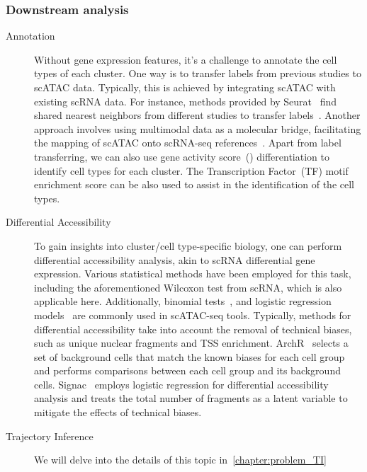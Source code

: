 \subsubsection{Downstream analysis}
\label{background:sec2:atac_downstream}
\begin{description}

	\item[Annotation]
	Without gene expression features, it's a challenge to annotate the cell types of each cluster. One way is to transfer labels from previous studies to scATAC data. Typically, this is achieved by integrating scATAC with existing scRNA data. For instance, methods provided by Seurat~\citep{stuart2019seurat3} find shared nearest neighbors from different studies to transfer labels~\citep{stuart2019seurat3}. Another approach involves using multimodal data as a molecular bridge, facilitating the mapping of scATAC onto scRNA-seq references~\citep{hao2023dictionary}. Apart from label transferring, we can also use gene activity score~() differentiation to identify cell types for each cluster. The Transcription Factor~(TF) motif enrichment score can be also used to assist in the identification of the cell types.

	\item[Differential Accessibility]
	To gain insights into cluster/cell type-specific biology, one can perform differential accessibility analysis, akin to scRNA differential gene expression. Various statistical methods have been employed for this task, including the aforementioned Wilcoxon test from scRNA, which is also applicable here. Additionally, binomial tests~\citep{cusanovich2018single}, and logistic regression models~\citep{hao2021seurat4} are commonly used in scATAC-seq tools. Typically, methods for differential accessibility take into account the removal of technical biases, such as unique nuclear fragments and TSS enrichment. ArchR~\citep{Granja2021} selects a set of background cells that match the known biases for each cell group and performs comparisons between each cell group and its background cells. Signac~\citep{hao2021seurat4} employs logistic regression for differential accessibility analysis and treats the total number of fragments as a latent variable to mitigate the effects of technical biases.

	\item[Trajectory Inference]
	We will delve into the details of this topic in~\cref{chapter:problem_TI}



\end{description}
